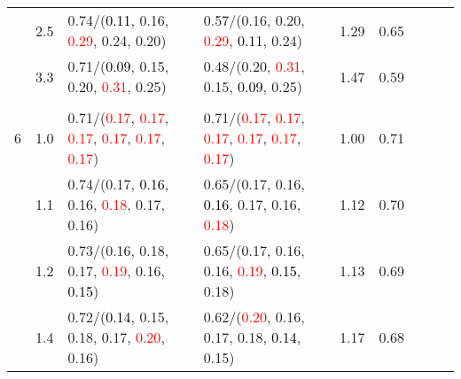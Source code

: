 \documentclass[10pt,a4paper]{report}
\begin{document}
\begin{table}[!htbp]
\begin{center}
{\begin{tabular}{ccllccccc}
				  & 2.5                               & 0.74/(\textcolor{black}{0.11}, 0.16, \textcolor{red}{0.29}, 0.24, 0.20)                                                                         & 0.57/(0.16, 0.20, \textcolor{red}{0.29}, \textcolor{black}{0.11}, 0.24)                                                                         & 1.29             & 0.65                     \\
				  & 3.3                               & 0.71/(\textcolor{black}{0.09}, 0.15, 0.20, \textcolor{red}{0.31}, 0.25)                                                                         & 0.48/(0.20, \textcolor{red}{0.31}, 0.15, \textcolor{black}{0.09}, 0.25)                                                                         & 1.47             & 0.59                     \\
				  &                                   &                                                                                                                                                 &                                                                                                                                                 &                                             \\
				6 & 1.0                               & 0.71/(\textcolor{red}{0.17}, \textcolor{red}{0.17}, \textcolor{red}{0.17}, \textcolor{red}{0.17}, \textcolor{red}{0.17}, \textcolor{red}{0.17}) & 0.71/(\textcolor{red}{0.17}, \textcolor{red}{0.17}, \textcolor{red}{0.17}, \textcolor{red}{0.17}, \textcolor{red}{0.17}, \textcolor{red}{0.17}) & 1.00             & 0.71                     \\
				  & 1.1                               & 0.74/(0.17, \textcolor{black}{0.16}, 0.16, \textcolor{red}{0.18}, 0.17, 0.16)                                                                   & 0.65/(0.17, 0.16, \textcolor{black}{0.16}, 0.17, 0.16, \textcolor{red}{0.18})                                                                   & 1.12             & 0.70                     \\
				  & 1.2                               & 0.73/(0.16, 0.18, 0.17, \textcolor{red}{0.19}, 0.16, \textcolor{black}{0.15})                                                                   & 0.65/(0.17, 0.16, 0.16, \textcolor{red}{0.19}, \textcolor{black}{0.15}, 0.18)                                                                   & 1.13             & 0.69                     \\
				  & 1.4                               & 0.72/(\textcolor{black}{0.14}, 0.15, 0.18, 0.17, \textcolor{red}{0.20}, 0.16)                                                                   & 0.62/(\textcolor{red}{0.20}, 0.16, 0.17, 0.18, \textcolor{black}{0.14}, 0.15)                                                                   & 1.17             & 0.68                     \\

\end{tabular}}
\end{center}
\end{table}
\end{document}
